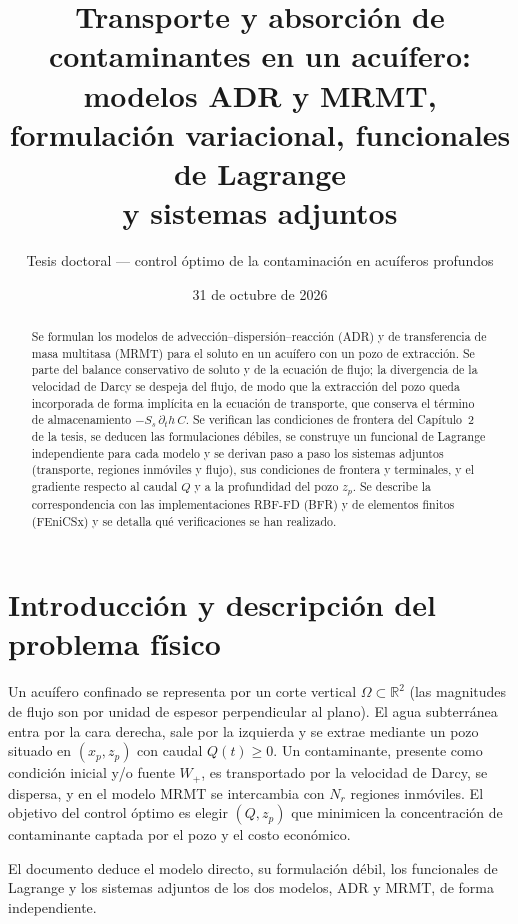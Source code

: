 \documentclass[11pt]{article}
\title{Transporte y absorci\'on de contaminantes en un acu\'ifero:\\
modelos ADR y MRMT, formulaci\'on variacional, funcionales de Lagrange\\
y sistemas adjuntos}
\author{Tesis doctoral --- control \'optimo de la contaminaci\'on en acu\'iferos profundos}
\date{31 de octubre de 2026}
\numberwithin{equation}{section}
\theoremstyle{remark}
\begin{document}
\maketitle

\begin{abstract}
Se formulan los modelos de advecci\'on--dispersi\'on--reacci\'on (ADR) y de
transferencia de masa multitasa (MRMT) para el soluto en un acu\'ifero con un
pozo de extracci\'on. Se parte del balance conservativo de soluto y de la
ecuaci\'on de flujo; la divergencia de la velocidad de Darcy se despeja del
flujo, de modo que la extracci\'on del pozo queda incorporada de forma impl\'icita
en la ecuaci\'on de transporte, que conserva el t\'ermino de almacenamiento
$-S_s\,\partial_th\,C$. Se verifican las condiciones de frontera del
Cap\'itulo~2 de la tesis, se deducen las formulaciones d\'ebiles, se construye
un funcional de Lagrange independiente para cada modelo y se derivan paso a paso
los sistemas adjuntos (transporte, regiones inm\'oviles y flujo), sus condiciones
de frontera y terminales, y el gradiente respecto al caudal $Q$ y a la
profundidad del pozo $z_p$. Se describe la correspondencia con las
implementaciones RBF-FD (BFR) y de elementos finitos (FEniCSx) y se detalla qu\'e
verificaciones se han realizado.
\end{abstract}

\tableofcontents

\section{Introducci\'on y descripci\'on del problema f\'isico}

Un acu\'ifero confinado se representa por un corte vertical $\Omega\subset\mathbb{R}^2$
(las magnitudes de flujo son por unidad de espesor perpendicular al plano). El agua
subterr\'anea entra por la cara derecha, sale por la izquierda y se extrae mediante un
pozo situado en $(x_p,z_p)$ con caudal $Q(t)\ge0$. Un contaminante, presente como
condici\'on inicial y/o fuente $W_+$, es transportado por la velocidad de Darcy,
se dispersa, y en el modelo MRMT se intercambia con $N_r$ regiones inm\'oviles.
El objetivo del control \'optimo es elegir $(Q,z_p)$ que minimicen la
concentraci\'on de contaminante captada por el pozo y el costo econ\'omico.

El documento deduce el modelo directo, su formulaci\'on d\'ebil, los funcionales de Lagrange y los
sistemas adjuntos de los dos modelos, ADR y MRMT, de forma independiente.
\end{document}
